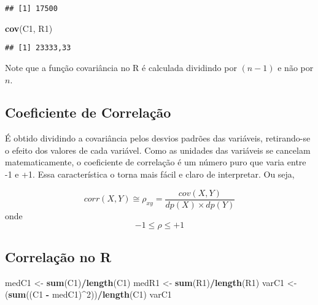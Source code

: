 \documentclass[
]{book}
\newenvironment{Shaded}{\begin{snugshade}}{\end{snugshade}}
\newcommand{\DecValTok}[1]{\textcolor[rgb]{0.00,0.00,0.81}{#1}}
\newcommand{\KeywordTok}[1]{\textcolor[rgb]{0.13,0.29,0.53}{\textbf{#1}}}
\newcommand{\NormalTok}[1]{#1}
\newcommand{\OperatorTok}[1]{\textcolor[rgb]{0.81,0.36,0.00}{\textbf{#1}}}
\newcommand{\StringTok}[1]{\textcolor[rgb]{0.31,0.60,0.02}{#1}}
\begin{document}
\begin{verbatim}
## [1] 17500
\end{verbatim}

\begin{Shaded}
\begin{Highlighting}[]
\KeywordTok{cov}\NormalTok{(C1, R1)}
\end{Highlighting}
\end{Shaded}

\begin{verbatim}
## [1] 23333,33
\end{verbatim}

Note que a função covariância no R é calculada dividindo por \((n-1)\) e não por \(n\).

\hypertarget{coeficiente-de-correlauxe7uxe3o}{%
\subsection{Coeficiente de Correlação}\label{coeficiente-de-correlauxe7uxe3o}}

É obtido dividindo a covariância pelos desvios padrões das variáveis, retirando-se o efeito dos valores de cada variável. Como as unidades das variáveis se cancelam matematicamente, o coeficiente de correlação é um número puro que varia entre -1 e +1. Essa característica o torna mais fácil e claro de interpretar. Ou seja,

\begin{equation*}
 corr(X,Y) \cong \rho_{xy} = \frac{cov(X,Y)}{dp(X) \times dp(Y)}
\end{equation*}
onde
\begin{equation*}
  -1 \leq \rho \leq +1
\end{equation*}

\hypertarget{correlauxe7uxe3o-no-r}{%
\subsection{Correlação no R}\label{correlauxe7uxe3o-no-r}}

\begin{Shaded}
\begin{Highlighting}[]
\NormalTok{medC1 <-}\StringTok{ }\KeywordTok{sum}\NormalTok{(C1)}\OperatorTok{/}\KeywordTok{length}\NormalTok{(C1)}
\NormalTok{medR1 <-}\StringTok{ }\KeywordTok{sum}\NormalTok{(R1)}\OperatorTok{/}\KeywordTok{length}\NormalTok{(R1)}
\NormalTok{varC1 <-}\StringTok{ }\NormalTok{(}\KeywordTok{sum}\NormalTok{((C1 }\OperatorTok{-}\StringTok{ }\NormalTok{medC1)}\OperatorTok{^}\DecValTok{2}\NormalTok{))}\OperatorTok{/}\KeywordTok{length}\NormalTok{(C1)}
\NormalTok{varC1}
\end{Highlighting}
\end{Shaded}
\end{document}
